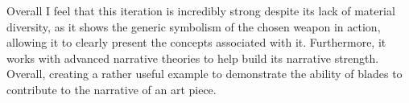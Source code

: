 \documentclass{article}
\begin{document}
Overall I feel that this iteration is incredibly strong despite its lack of material diversity, as it shows the generic symbolism of the chosen weapon in action, allowing it to clearly present the concepts associated with it. Furthermore, it works with advanced narrative theories to help build its narrative strength. Overall, creating a rather useful example to demonstrate the ability of blades to contribute to the narrative of an art piece.

\pagebreak

\printbibliography

\pagebreak
\end{document}
